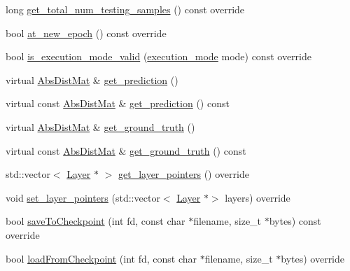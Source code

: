 \begin{DoxyCompactItemize}
\item 
long \hyperlink{classlbann_1_1generic__target__layer_af41c92981e0a1731d3dee9b1b49201db}{get\+\_\+total\+\_\+num\+\_\+testing\+\_\+samples} () const override
\item 
bool \hyperlink{classlbann_1_1generic__target__layer_a9bdeadd84f0b4f31b755fdd338492b1a}{at\+\_\+new\+\_\+epoch} () const override
\item 
bool \hyperlink{classlbann_1_1generic__target__layer_a0ae18b3b410c3b6c1a5b34a3547ba4c5}{is\+\_\+execution\+\_\+mode\+\_\+valid} (\hyperlink{base_8hpp_a2781a159088df64ed7d47cc91c4dc0a8}{execution\+\_\+mode} mode) const override
\item 
virtual \hyperlink{base_8hpp_a9a697a504ae84010e7439ffec862b470}{Abs\+Dist\+Mat} \& \hyperlink{classlbann_1_1generic__target__layer_ac0b88a705256ab06bbba6bbffbc7ebc1}{get\+\_\+prediction} ()
\item 
virtual const \hyperlink{base_8hpp_a9a697a504ae84010e7439ffec862b470}{Abs\+Dist\+Mat} \& \hyperlink{classlbann_1_1generic__target__layer_a35de513f32f2db03587623d09ca3d3c9}{get\+\_\+prediction} () const
\item 
virtual \hyperlink{base_8hpp_a9a697a504ae84010e7439ffec862b470}{Abs\+Dist\+Mat} \& \hyperlink{classlbann_1_1generic__target__layer_a9cbe476f3e447bc91e2834921ca7da9f}{get\+\_\+ground\+\_\+truth} ()
\item 
virtual const \hyperlink{base_8hpp_a9a697a504ae84010e7439ffec862b470}{Abs\+Dist\+Mat} \& \hyperlink{classlbann_1_1generic__target__layer_a073c3ea648d5ba040e3a4acaa1dcf480}{get\+\_\+ground\+\_\+truth} () const
\item 
std\+::vector$<$ \hyperlink{classlbann_1_1Layer}{Layer} $\ast$ $>$ \hyperlink{classlbann_1_1generic__target__layer_a0325a9703238ac0120893214fd0983b5}{get\+\_\+layer\+\_\+pointers} () override
\item 
void \hyperlink{classlbann_1_1generic__target__layer_a1f8f722fadb1223b063c0917afd83b66}{set\+\_\+layer\+\_\+pointers} (std\+::vector$<$ \hyperlink{classlbann_1_1Layer}{Layer} $\ast$$>$ layers) override
\item 
bool \hyperlink{classlbann_1_1generic__target__layer_aff8b79ff0392bd78c44a5a4f6b6ef549}{save\+To\+Checkpoint} (int fd, const char $\ast$filename, size\+\_\+t $\ast$bytes) const override
\item 
bool \hyperlink{classlbann_1_1generic__target__layer_a2d9f6ac689171acf0caceed3ed4f7ef9}{load\+From\+Checkpoint} (int fd, const char $\ast$filename, size\+\_\+t $\ast$bytes) override
\item 
$$
\end{DoxyCompactItemize}
